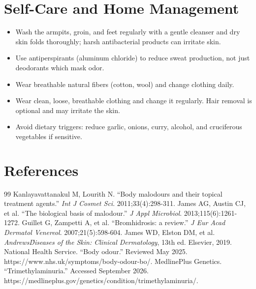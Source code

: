 \section*{Self-Care and Home Management}
\begin{itemize}
 \item Wash the armpits, groin, and feet regularly with a gentle cleanser and dry skin folds thoroughly; harsh antibacterial products can irritate skin.
 \item Use antiperspirants (aluminum chloride) to reduce sweat production, not just deodorants which mask odor.
 \item Wear breathable natural fibers (cotton, wool) and change clothing daily.
 \item Wear clean, loose, breathable clothing and change it regularly. Hair removal is optional and may irritate the skin.
 \item Avoid dietary triggers: reduce garlic, onions, curry, alcohol, and cruciferous vegetables if sensitive.
\end{itemize}

\section*{References}
\begin{thebibliography}{99}
 Kanlayavattanakul M, Lourith N. ``Body malodours and their topical treatment agents.'' \textit{Int J Cosmet Sci}. 2011;33(4):298-311.
 James AG, Austin CJ, et al. ``The biological basis of malodour.'' \textit{J Appl Microbiol}. 2013;115(6):1261-1272.
 Guillet G, Zampetti A, et al. ``Bromhidrosis: a review.'' \textit{J Eur Acad Dermatol Venereol}. 2007;21(5):598-604.
 James WD, Elston DM, et al. \textit{Andrews\' Diseases of the Skin: Clinical Dermatology}, 13th ed. Elsevier, 2019.
 National Health Service. ``Body odour.'' Reviewed May 2025. https://www.nhs.uk/symptoms/body-odour-bo/.
 MedlinePlus Genetics. ``Trimethylaminuria.'' Accessed September 2026. https://medlineplus.gov/genetics/condition/trimethylaminuria/.
\end{thebibliography}
